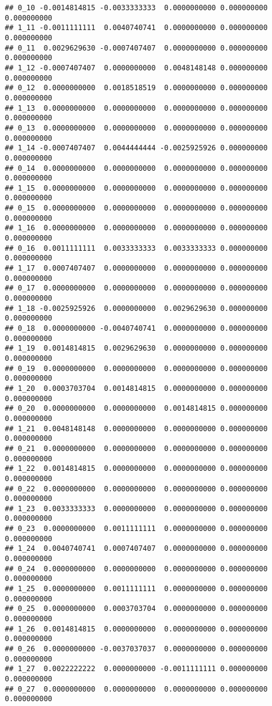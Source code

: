 \documentclass[]{article}
\begin{document}
\begin{verbatim}
## 0_10 -0.0014814815 -0.0033333333  0.0000000000 0.000000000  0.000000000
## 1_11 -0.0011111111  0.0040740741  0.0000000000 0.000000000  0.000000000
## 0_11  0.0029629630 -0.0007407407  0.0000000000 0.000000000  0.000000000
## 1_12 -0.0007407407  0.0000000000  0.0048148148 0.000000000  0.000000000
## 0_12  0.0000000000  0.0018518519  0.0000000000 0.000000000  0.000000000
## 1_13  0.0000000000  0.0000000000  0.0000000000 0.000000000  0.000000000
## 0_13  0.0000000000  0.0000000000  0.0000000000 0.000000000  0.000000000
## 1_14 -0.0007407407  0.0044444444 -0.0025925926 0.000000000  0.000000000
## 0_14  0.0000000000  0.0000000000  0.0000000000 0.000000000  0.000000000
## 1_15  0.0000000000  0.0000000000  0.0000000000 0.000000000  0.000000000
## 0_15  0.0000000000  0.0000000000  0.0000000000 0.000000000  0.000000000
## 1_16  0.0000000000  0.0000000000  0.0000000000 0.000000000  0.000000000
## 0_16  0.0011111111  0.0033333333  0.0033333333 0.000000000  0.000000000
## 1_17  0.0007407407  0.0000000000  0.0000000000 0.000000000  0.000000000
## 0_17  0.0000000000  0.0000000000  0.0000000000 0.000000000  0.000000000
## 1_18 -0.0025925926  0.0000000000  0.0029629630 0.000000000  0.000000000
## 0_18  0.0000000000 -0.0040740741  0.0000000000 0.000000000  0.000000000
## 1_19  0.0014814815  0.0029629630  0.0000000000 0.000000000  0.000000000
## 0_19  0.0000000000  0.0000000000  0.0000000000 0.000000000  0.000000000
## 1_20  0.0003703704  0.0014814815  0.0000000000 0.000000000  0.000000000
## 0_20  0.0000000000  0.0000000000  0.0014814815 0.000000000  0.000000000
## 1_21  0.0048148148  0.0000000000  0.0000000000 0.000000000  0.000000000
## 0_21  0.0000000000  0.0000000000  0.0000000000 0.000000000  0.000000000
## 1_22  0.0014814815  0.0000000000  0.0000000000 0.000000000  0.000000000
## 0_22  0.0000000000  0.0000000000  0.0000000000 0.000000000  0.000000000
## 1_23  0.0033333333  0.0000000000  0.0000000000 0.000000000  0.000000000
## 0_23  0.0000000000  0.0011111111  0.0000000000 0.000000000  0.000000000
## 1_24  0.0040740741  0.0007407407  0.0000000000 0.000000000  0.000000000
## 0_24  0.0000000000  0.0000000000  0.0000000000 0.000000000  0.000000000
## 1_25  0.0000000000  0.0011111111  0.0000000000 0.000000000  0.000000000
## 0_25  0.0000000000  0.0003703704  0.0000000000 0.000000000  0.000000000
## 1_26  0.0014814815  0.0000000000  0.0000000000 0.000000000  0.000000000
## 0_26  0.0000000000 -0.0037037037  0.0000000000 0.000000000  0.000000000
## 1_27  0.0022222222  0.0000000000 -0.0011111111 0.000000000  0.000000000
## 0_27  0.0000000000  0.0000000000  0.0000000000 0.000000000  0.000000000

\end{verbatim}
\end{document}
